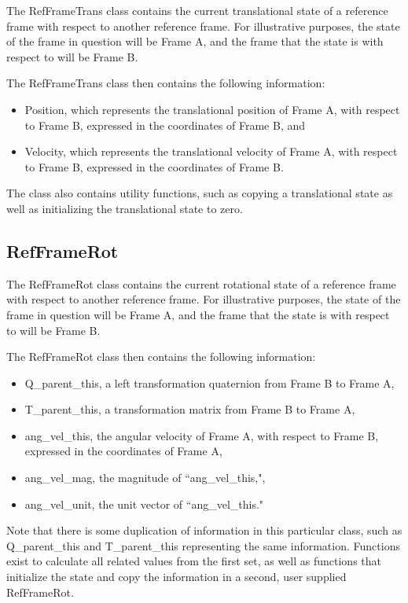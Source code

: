 The RefFrameTrans class contains the current translational state of a reference
frame with respect to another reference frame. For illustrative purposes,
the state of the frame in question will be Frame A, and the frame that the
state is with respect to will be Frame B.

The RefFrameTrans class then contains the following information:

\begin{itemize}
\item{Position}, which represents the translational
position of Frame A, with respect to
Frame B, expressed in the coordinates of Frame B, and
\item{Velocity}, which represents the translational velocity of Frame A,
with respect to Frame B, expressed in the coordinates of Frame B.
\end{itemize}

The class also contains utility functions, such as copying a translational
state as well as initializing the translational state to zero.

\subsection{RefFrameRot}

The RefFrameRot class contains the current rotational state of a reference
frame with respect to another reference frame. For illustrative purposes,
the state of the frame in question will be Frame A, and the frame that
the state is with respect to will be Frame B.

The RefFrameRot class then contains the following information:

\begin{itemize}
\item{Q\_parent\_this}, a left transformation quaternion from Frame B to
Frame A,
\item{T\_parent\_this}, a transformation matrix from Frame B to Frame A,
\item{ang\_vel\_this}, the angular velocity of Frame A, with respect to
Frame B, expressed in the coordinates of Frame A,
\item{ang\_vel\_mag}, the magnitude of ``ang\_vel\_this,",
\item{ang\_vel\_unit}, the unit vector of ``ang\_vel\_this."
\end{itemize}

Note that there is some duplication of information in this particular class,
such as Q\_parent\_this and T\_parent\_this representing the same information.
Functions exist to calculate all related values from the first set, as well
as functions that initialize the state and copy the information in a second,
user supplied RefFrameRot.

